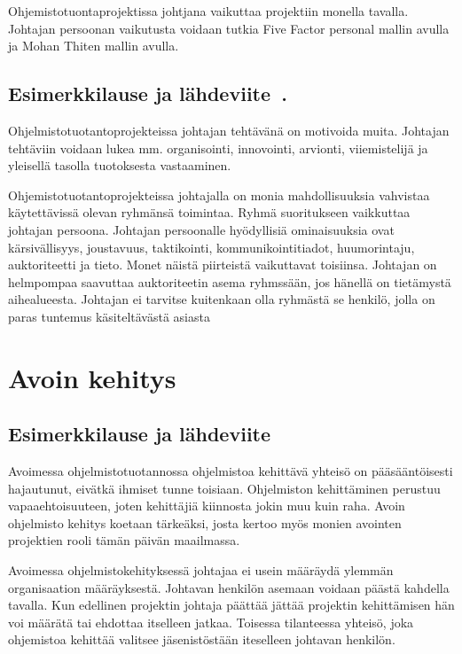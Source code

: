 \documentclass[finnish]{tktltiki2}
\theoremstyle{definition}
\theoremstyle{remark}
\begin{document}
Ohjemistotuontaprojektissa johtjana vaikuttaa projektiin monella tavalla. Johtajan persoonan vaikutusta voidaan tutkia Five Factor personal mallin avulla ja Mohan Thiten mallin avulla. 


\subsection{Esimerkkilause ja lähdeviite~\cite{4017705}.}

Ohjelmistotuotantoprojekteissa johtajan tehtävänä on motivoida muita. Johtajan tehtäviin voidaan lukea mm. organisointi, innovointi, arvionti, viiemistelijä  ja yleisellä tasolla tuotoksesta vastaaminen. 

Ohjemistotuotantoprojekteissa johtajalla on monia mahdollisuuksia vahvistaa käytettävissä olevan ryhmänsä toimintaa. Ryhmä suoritukseen vaikkuttaa johtajan persoona. Johtajan persoonalle hyödyllisiä ominaisuuksia ovat kärsivällisyys, joustavuus, taktikointi, kommunikointitiadot, huumorintaju, auktoriteetti ja tieto. Monet näistä piirteistä vaikuttavat toisiinsa. Johtajan on helmpompaa saavuttaa auktoriteetin asema ryhmssään, jos hänellä on tietämystä aihealueesta. Johtajan ei tarvitse kuitenkaan olla ryhmästä se henkilö, jolla on paras tuntemus käsiteltävästä asiasta 

\section{Avoin kehitys}
\subsection{Esimerkkilause ja lähdeviite~\cite{Li:2006:MOS:1125170.1125182}}

Avoimessa ohjelmistotuotannossa ohjelmistoa kehittävä yhteisö on pääsääntöisesti hajautunut, eivätkä ihmiset tunne toisiaan. Ohjelmiston kehittäminen perustuu vapaaehtoisuuteen, joten kehittäjiä kiinnosta jokin muu kuin raha. Avoin ohjelmisto kehitys koetaan tärkeäksi, josta kertoo myös monien avointen projektien rooli tämän päivän maailmassa. 
 
Avoimessa ohjelmistokehityksessä johtajaa ei usein määräydä ylemmän organisaation määräyksestä. Johtavan henkilön asemaan voidaan päästä kahdella tavalla. Kun edellinen projektin johtaja päättää jättää projektin kehittämisen hän voi määrätä tai ehdottaa itselleen jatkaa. Toisessa tilanteessa yhteisö, joka ohjemistoa kehittää valitsee jäsenistöstään iteselleen johtavan henkilön.
\end{document}
